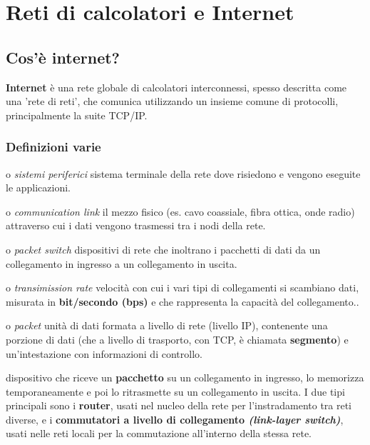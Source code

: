\section{Reti di calcolatori e Internet}

\subsection{Cos'è internet?}
\textbf{Internet} è una rete globale di calcolatori interconnessi, spesso descritta come una 'rete di reti', che comunica utilizzando un insieme comune di protocolli, principalmente la suite TCP/IP.
\subsubsection{Definizioni varie}
\begin{description}[font=\sffamily\bfseries, leftmargin=1cm, style=nextline]
  \item[host] 
    o \textit{sistemi periferici} sistema terminale della rete dove risiedono e vengono eseguite le applicazioni.
  \item[rete di collegamenti]
    o \textit{communication link} il mezzo fisico (es. cavo coassiale, fibra ottica, onde radio) attraverso cui i dati vengono trasmessi tra i nodi della rete.
  \item[commutatori di pacchetti]
    o \textit{packet switch} dispositivi di rete che inoltrano i pacchetti di dati da un collegamento in ingresso a un collegamento in uscita.
  \item[velocità di trasmissione]
    o \textit{transimission rate} velocità con cui i vari tipi di collegamenti si scambiano dati, misurata in \textbf{bit/secondo (bps)} e che rappresenta la capacità del collegamento..
  \item[pacchetto]
    o \textit{packet} unità di dati formata a livello di rete (livello IP), contenente una porzione di dati (che a livello di trasporto, con TCP, è chiamata \textbf{segmento}) e un'intestazione con informazioni di controllo. 
  \item[commutatore di pacchetto]
    dispositivo che riceve un \textbf{pacchetto} su un collegamento in ingresso, lo memorizza temporaneamente e poi lo ritrasmette su un collegamento in uscita. I due tipi principali sono i \textbf{router}, usati nel nucleo della rete per l'instradamento tra reti diverse, e i \textbf{commutatori a livello di collegamento \textit{(link-layer switch)}}, usati nelle reti locali per la commutazione all'interno della stessa rete. 

\end{description}
